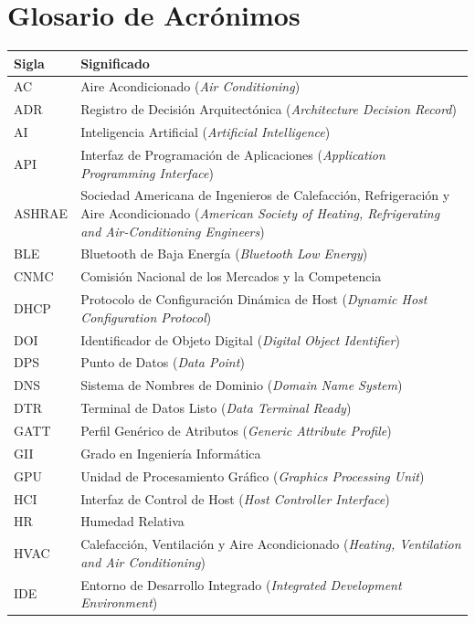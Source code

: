 \chapter{Glosario de Acrónimos}
\label{cap:glosario}

\begin{longtable}{|l|p{10cm}|}
\hline
\textbf{Sigla} & \textbf{Significado} \\
\hline
\endhead
\hline
\endfoot
AC & Aire Acondicionado (\textit{Air Conditioning}) \\
ADR & Registro de Decisión Arquitectónica (\textit{Architecture Decision Record}) \\
AI & Inteligencia Artificial (\textit{Artificial Intelligence}) \\
API & Interfaz de Programación de Aplicaciones (\textit{Application Programming Interface}) \\
ASHRAE & Sociedad Americana de Ingenieros de Calefacción, Refrigeración y Aire Acondicionado (\textit{American Society of Heating, Refrigerating and Air-Conditioning Engineers}) \\
BLE & Bluetooth de Baja Energía (\textit{Bluetooth Low Energy}) \\
CNMC & Comisión Nacional de los Mercados y la Competencia \\
DHCP & Protocolo de Configuración Dinámica de Host (\textit{Dynamic Host Configuration Protocol}) \\
DOI & Identificador de Objeto Digital (\textit{Digital Object Identifier}) \\
DPS & Punto de Datos (\textit{Data Point}) \\
DNS & Sistema de Nombres de Dominio (\textit{Domain Name System}) \\
DTR & Terminal de Datos Listo (\textit{Data Terminal Ready}) \\
GATT & Perfil Genérico de Atributos (\textit{Generic Attribute Profile}) \\
GII & Grado en Ingeniería Informática \\
GPU & Unidad de Procesamiento Gráfico (\textit{Graphics Processing Unit}) \\
HCI & Interfaz de Control de Host (\textit{Host Controller Interface}) \\
HR & Humedad Relativa \\
HVAC & Calefacción, Ventilación y Aire Acondicionado (\textit{Heating, Ventilation and Air Conditioning}) \\
IDE & Entorno de Desarrollo Integrado (\textit{Integrated Development Environment}) \\

\end{longtable}

